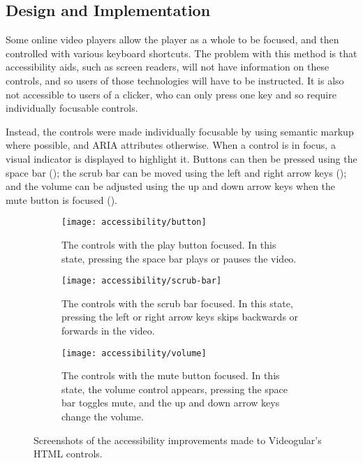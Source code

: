 \subsection{Design and Implementation}
Some online video players allow the player as a whole to be focused, and then controlled with various keyboard shortcuts. The problem with this method is that accessibility aids, such as screen readers, will not have information on these controls, and so users of those technologies will have to be instructed. It is also not accessible to users of a clicker, who can only press one key and so require individually focusable controls.

Instead, the controls were made individually focusable by using semantic markup where possible, and \gls{ARIA} attributes otherwise. When a control is in focus, a visual indicator is displayed to highlight it. Buttons can then be pressed using the space bar (); the scrub bar can be moved using the left and right arrow keys (); and the volume can be adjusted using the up and down arrow keys when the mute button is focused ().

\begin{figure}
	\begin{subfigure}[]{\textwidth}
		\texttt{[image: accessibility/button]}
		\caption{The controls with the play button focused. In this state, pressing the space bar plays or pauses the video.}
		\label{Figure:Accessibility/Screenshots/Button}
	\end{subfigure}
	\begin{subfigure}[]{\textwidth}
		\texttt{[image: accessibility/scrub-bar]}
		\caption{The controls with the scrub bar focused. In this state, pressing the left or right arrow keys skips backwards or forwards in the video.}
		\label{Figure:Accessibility/Screenshots/ScrubBar}
	\end{subfigure}
	\begin{subfigure}[]{\textwidth}
		\texttt{[image: accessibility/volume]}
		\caption{The controls with the mute button focused. In this state, the volume control appears, pressing the space bar toggles mute, and the up and down arrow keys change the volume.}
		\label{Figure:Accessibility/Screenshots/Volume}
	\end{subfigure}
	\caption{Screenshots of the accessibility improvements made to \gls{Videogular}'s HTML controls.}
	\label{Figure:Accessibility/Screenshots}
\end{figure}

